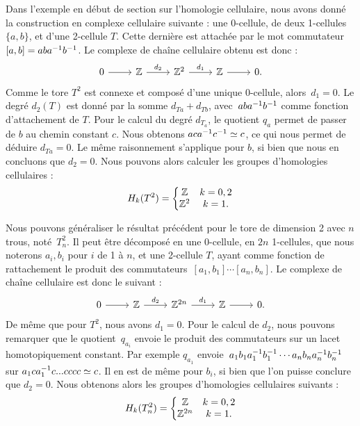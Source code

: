 \begin{exemple}
Dans l'exemple en début de section sur l'homologie cellulaire, nous avons donné la construction en complexe cellulaire suivante : une 0-cellule, de deux 1-cellules $\{a,b\}$, et d'une 2-cellule $T$. Cette dernière est attachée par le mot commutateur $[a,b]=aba^{-1} b^{-1}$. Le complexe de chaîne cellulaire obtenu est donc : \[\begin{tikzcd}
0\arrow[r]&\bb{Z}\arrow[r,"d_2"]&\bb{Z}^2\arrow[r,"d_1"]&\bb{Z}\arrow[r]&0.
\end{tikzcd}\] Comme le tore $T^2$ est connexe et composé d'une unique 0-cellule, alors~$d_1=0$. Le degré $d_2(T)$ est donné par la somme $d_{Ta}+d_{Tb}$, avec~${aba^{-1} b^{-1}}$ comme fonction d'attachement de $T$. Pour le calcul du degré $d_{T_a}$, le quotient $q_a$ permet de passer de $b$ au chemin constant $c$. Nous obtenons $aca^{-1} c^{-1}\simeq c$, ce qui nous permet de déduire $d_{Ta}=0$. Le même raisonnement s'applique pour $b$, si bien que nous en concluons que $d_2=0$. Nous pouvons alors calculer les groupes d'homologies cellulaires : \[H_k(T^2)= \left\{\begin{matrix}
\mathbb{Z} &k=0,2  \\
\mathbb{Z}^2 &k=1.  \\
\end{matrix}\right.\]
\end{exemple}
\begin{exemple}
Nous pouvons généraliser le résultat précédent pour le tore de dimension 2 avec $n$ trous, noté~$T^2_n$. Il peut être décomposé en une 0-cellule, en $2n$ 1-cellules, que nous noterons $a_i,b_i$ pour $i$ de 1 à $n$, et une 2-cellule $T$, ayant comme fonction de rattachement le produit des commutateurs~${[a_1,b_1]\cdots[a_n,b_n]}$. Le complexe de chaîne cellulaire est donc le suivant : \[\begin{tikzcd}
0\arrow[r]&\bb{Z}\arrow[r,"d_2"]&\bb{Z}^{2n}\arrow[r,"d_1"]&\bb{Z}\arrow[r]&0.
\end{tikzcd}\]
De même que pour $T^2$, nous avons $d_1=0$. Pour le calcul de $d_2$, nous pouvons remarquer que le quotient~$q_{a_i}$ envoie le produit des commutateurs sur un lacet homotopiquement constant. Par exemple $q_{a_1}$ envoie~$a_1b_1a_1^{-1} b_1^{-1}\cdots a_nb_na_n^{-1} b_n^{-1}$ sur $a_1ca_1^{-1} c...cccc\simeq c$. Il en est de même pour $b_i$, si bien que l'on puisse conclure que $d_2=0$. Nous obtenons alors les groupes d'homologies cellulaires suivants : 
\[H_k(T^2_{n})= \left\{\begin{matrix}
\mathbb{Z} &k=0,2  \\
\mathbb{Z}^{2n} &k=1.  \\
\end{matrix}\right.\]
\end{exemple}

